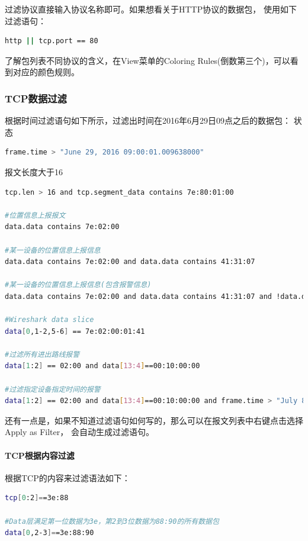 \documentclass{book}
\begin{document}
过滤协议直接输入协议名称即可。如果想看关于HTTP协议的数据包，
使用如下过滤语句：

\begin{lstlisting}[language=Bash]
http || tcp.port == 80
\end{lstlisting}

了解包列表不同协议的含义，在View菜单的Coloring Rules(倒数第三个)，可以看到对应的颜色规则。

\subsubsection{TCP数据过滤}

根据时间过滤语句如下所示，过滤出时间在2016年6月29日09点之后的数据包：
状态
\begin{lstlisting}[language=Bash]
frame.time > "June 29, 2016 09:00:01.009638000"
\end{lstlisting}

报文长度大于16

\begin{lstlisting}[language=Bash]
tcp.len > 16 and tcp.segment_data contains 7e:80:01:00

#位置信息上报报文
data.data contains 7e:02:00

#某一设备的位置信息上报信息
data.data contains 7e:02:00 and data.data contains 41:31:07

#某一设备的位置信息上报信息(包含报警信息)
data.data contains 7e:02:00 and data.data contains 41:31:07 and !data.data[53,4] == 00:00:00:00

#Wireshark data slice
data[0,1-2,5-6] == 7e:02:00:01:41

#过滤所有进出路线报警
data[1:2] == 02:00 and data[13:4]==00:10:00:00

#过滤指定设备指定时间的报警
data[1:2] == 02:00 and data[13:4]==00:10:00:00 and frame.time > "July 8, 2016 10:00:01.009638000" and frame.time < "July 8, 2016 17:00:01.009638000" and data[8:3] == 07:18:13
\end{lstlisting}

还有一点是，如果不知道过滤语句如何写的，那么可以在报文列表中右键点击选择Apply as Filter，
会自动生成过滤语句。

\paragraph{TCP根据内容过滤}

根据TCP的内容来过滤语法如下：

\begin{lstlisting}[language=Bash]
tcp[0:2]==3e:88

#Data层满足第一位数据为3e，第2到3位数据为88:90的所有数据包
data[0,2-3]==3e:88:90
\end{lstlisting}
\end{document}
